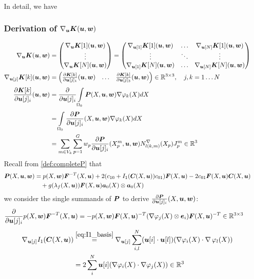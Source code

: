 In detail, we have
\subsubsection{Derivation of $\nabla_{\vu}\vK(\vu,\vw)$}
\begin{align*}
	\nabla_{\vu}\vK(\vu,\vw) &= \m{\nabla_{\vu}\vK[1](\vu,\vw)\\ \vdots \\ \nabla_{\vu}\vK[N](\vu,\vw)}
	 = \m{\nabla_{\vu[1]}\vK[1](\vu,\vw) & \ldots & \nabla_{\vu[N]}\vK[1](\vu,\vw)\\
	 	\vdots & \ddots & \vdots\\
	   \nabla_{\vu[1]}\vK[N](\vu,\vw) & \ldots & \nabla_{\vu[N]}\vK[N](\vu,\vw)}\\
	\nabla_{\vu[j]}\vK[k](\vu,\vw) &=\m{\d{\vK[k]}{\vu[j]_1}(\vu,\vw) & \ldots & \d{\vK[k]}{\vu[j]_3}(\vu,\vw)}\in\R^{3\times 3},\quad j,k=1\ldots N\\
	\d{\vK[k]}{\vu[j]_i}(\vu,\vw) &= \d{}{\vu[j]_i} \intor\vP(X,\vu,\vw)\dpk dX\\
		&=  \intor\d{\vP}{\vu[j]_i}(X,\vu,\vw) \dpk dX\\
		&= \sumvk\sumgp w_p \d{\vP}{\vu[j]_i}(\pmp,\vu,\vw) \dNkmp\jmp\in\R^3
\end{align*}
Recall from \eqref{def:completeP} that
\begin{align*}
\vP(X,\vu,\vw) &= p(X,\vw)\vF^{-T}(X,\vu) + 2(c_{10} + I_1(\vC(X,\vu))c_{01})\vF(X,\vu) - 2c_{01}\vF(X,\vu)\vC(X,\vu)\\
	     &\quad+g(\lambda_f(X,\vu))\vF(X,\vu)\va_0(X)\otimes\va_0(X)
\end{align*}
we consider the single summands of $\vP$ to derive $\d{\vP}{\vu[j]_i}(X,\vu,\vw)$:
\begin{align*}
	 \d{}{\vu[j]_i}p(X,\vw)\vF^{-T}(X,\vu) &= -p(X,\vw)\vF(X,\vu)^{-T}(\dpj\otimes\ve_i)\vF(X,\vu)^{-T}\in\R^{3\times 3}
\end{align*}
\begin{align*}
	\nabla_{\vu[j]}I_1(\vC(X,\vu)) &\re{eq:I1_basis} \nabla_{\vu[j]}\suml{i,l}{N} (\vu[i] \cdot \vu[l])(\dpi \cdot \divergence\varphi_l(X))\\
	&= 2\suml{i}{N} \vu[i](\dpi \cdot \dpj) \in\R^3
\end{align*}
